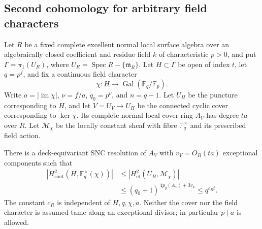 \subsection{Second cohomology for arbitrary field characters}

\begin{lemma}
\label{D:arbitrary-field-character-H2}
Let \(R\) be a fixed complete excellent normal local surface
algebra over an algebraically closed coefficient and residue
field \(k\) of characteristic \(p>0\), and put
\(\Gamma=\pi_1(U_R)\), where
\(U_R=\operatorname{Spec}R-\{\mathfrak m_R\}\).
Let \(H\subset\Gamma\) be open of index \(t\), let
\(q=p^f\), and fix a continuous field character
\[
 \chi:H\longrightarrow\operatorname{Gal}(\mathbb F_q/\mathbb F_p).
                                                        \tag{D.WH.1}
\]
Write \(a=|\operatorname{im}\chi|\), \(\nu=f/a\),
\(q_0=p^\nu\), and \(n=q-1\).
Let \(U_H\) be the puncture corresponding to \(H\), and
let \(V=U_V\to U_H\) be the connected cyclic cover
corresponding to \(\ker\chi\). Its complete normal local
cover ring \(A_V\) has degree \(ta\) over \(R\).
Let \(\mathcal M_\chi\) be the locally constant sheaf
with fibre \(\mathbb F_q^\times\) and its prescribed
field action.

There is a deck-equivariant SNC resolution of \(A_V\)
with \(v_V=O_R(ta)\) exceptional components such that
\[
 \begin{aligned}
 |H^2_{\mathrm{cont}}(H,\mathbb F_q^\times(\chi))|
 &\le |H^2_{\mathrm{et}}(U_H,\mathcal M_\chi)|\\
 &\le(q_0+1)^{\,4p_g(A_V)+3v_V}
 \le q^{c_Rt}.
 \end{aligned}                                         \tag{D.WH.2}
\]
The constant \(c_R\) is independent of \(H,q,\chi,a\).
Neither the cover nor the field character is assumed
tame along an exceptional divisor; in particular
\(p\mid a\) is allowed.
\end{lemma}

